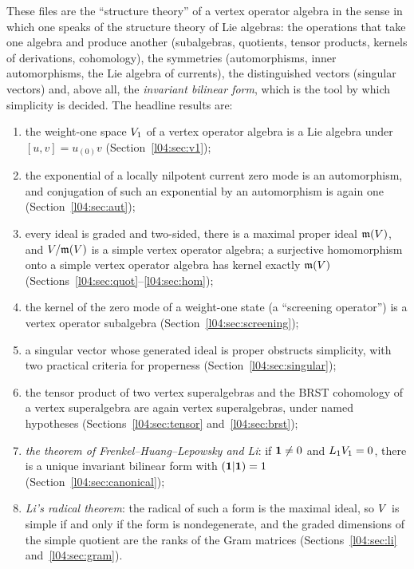 These files are the ``structure theory'' of a vertex operator algebra in the sense in which one
speaks of the structure theory of Lie algebras: the operations that take one algebra and produce
another (subalgebras, quotients, tensor products, kernels of derivations, cohomology), the
symmetries (automorphisms, inner automorphisms, the Lie algebra of currents), the distinguished
vectors (singular vectors) and, above all, the \emph{invariant bilinear form}, which is the tool by
which simplicity is decided. The headline results are:
\begin{enumerate}
\item the weight-one space $V_1$ of a vertex operator algebra is a Lie algebra under
  $[u,v] = u_{(0)}v$ (Section~\ref{l04:sec:v1});
\item the exponential of a locally nilpotent current zero mode is an automorphism, and
  conjugation of such an exponential by an automorphism is again one (Section~\ref{l04:sec:aut});
\item every ideal is graded and two-sided, there is a maximal proper ideal $\mathfrak{m}(V)$, and
  $V/\mathfrak{m}(V)$ is a simple vertex operator algebra; a surjective homomorphism onto a
  simple vertex operator algebra has kernel exactly $\mathfrak{m}(V)$
  (Sections~\ref{l04:sec:quot}--\ref{l04:sec:hom});
\item the kernel of the zero mode of a weight-one state (a ``screening operator'') is a vertex
  operator subalgebra (Section~\ref{l04:sec:screening});
\item a singular vector whose generated ideal is proper obstructs simplicity, with two practical
  criteria for properness (Section~\ref{l04:sec:singular});
\item the tensor product of two vertex superalgebras and the BRST cohomology of a vertex
  superalgebra are again vertex superalgebras, under named hypotheses
  (Sections~\ref{l04:sec:tensor} and~\ref{l04:sec:brst});
\item \emph{the theorem of Frenkel--Huang--Lepowsky and Li}: if $\mathbf{1}\ne0$ and
  $L_1V_1 = 0$, there is a unique invariant bilinear form with $(\mathbf{1}|\mathbf{1}) = 1$
  (Section~\ref{l04:sec:canonical});
\item \emph{Li's radical theorem}: the radical of such a form is the maximal ideal, so $V$
  is simple if and only if the form is nondegenerate, and the graded dimensions of the simple
  quotient are the ranks of the Gram matrices (Sections~\ref{l04:sec:li} and~\ref{l04:sec:gram}).
\end{enumerate}
